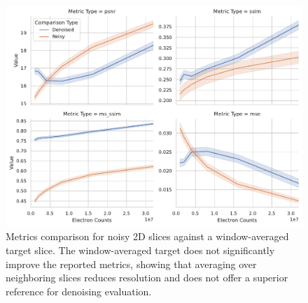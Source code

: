 \begin{figure}
    \centering
    \includegraphics[width=1\linewidth]{images/metrics_comparison_denoised_noisy_averaged.pdf}
    \caption{Metrics comparison for noisy 2D slices against a window-averaged target slice. The window-averaged target does not significantly improve the reported metrics, showing that averaging over neighboring slices reduces resolution and does not offer a superior reference for denoising evaluation.}
    \label{fig:metrics-comparison-averaged-target}
\end{figure}